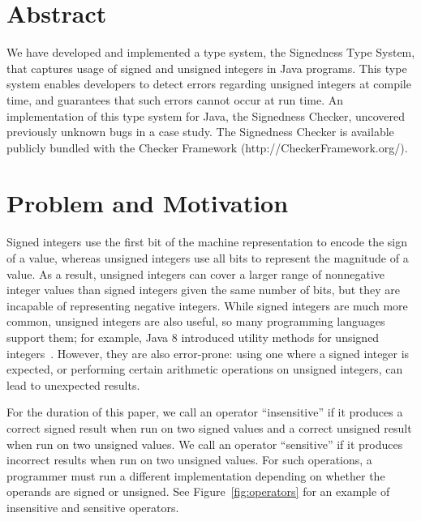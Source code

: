\section*{Abstract}
We have developed and implemented a type system, the Signedness Type System,
that captures usage of signed and unsigned integers in Java programs. This
type system enables developers to detect errors regarding unsigned integers at
compile time, and guarantees that such errors cannot occur at run time. An
implementation of this type system for Java, the Signedness Checker, uncovered
previously unknown bugs in a case study. The Signedness Checker is available
publicly bundled with the Checker Framework (http://CheckerFramework.org/).

\newpage
\tableofcontents

\newpage
\section{Problem and Motivation}

Signed integers use the first bit of the machine representation to
encode the sign of a value, whereas unsigned integers use all
bits to represent the magnitude of a value.
As a result, unsigned integers can cover a larger range of nonnegative integer
values than signed integers given the same number of bits, but they are
incapable of representing negative integers. While signed integers are much
more common,
unsigned integers are also useful, so many programming languages support them;
for example, Java 8 introduced utility methods for unsigned
integers~\cite{JDK8UnsignedIntegerArithmetic2012}.  However, they are also
error-prone:  using one where a signed
integer is expected, or performing certain arithmetic operations on unsigned
integers, can lead to unexpected results.

For the duration of this paper,
we call an operator ``insensitive'' if it produces a correct signed result
when run on two signed values and a correct unsigned result
when run on two unsigned values.  We call an operator ``sensitive'' if it
produces incorrect results when run on two unsigned values. For such
operations, a programmer must run a different implementation depending on
whether
the operands are signed or unsigned.
See Figure~\ref{fig:operators} for
an example of insensitive and sensitive operators.

